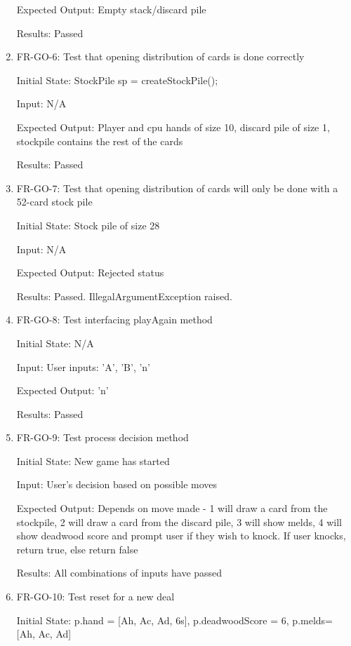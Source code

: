 \documentclass[12pt, titlepage]{article}
\begin{document}
\begin{enumerate}
    Expected Output: Empty stack/discard pile
    
    Results: Passed
    
    \item FR-GO-6: Test that opening distribution of cards is done correctly
    
    Initial State: StockPile sp = createStockPile();
    
    Input: N/A

    Expected Output: Player and cpu hands of size 10, discard pile of size 1, stockpile contains the rest of the cards

    Results: Passed
    
    \item FR-GO-7: Test that opening distribution of cards will only be  done with a 52-card stock pile 
    
    Initial State: Stock pile of size 28
    
    Input: N/A
    
    Expected Output: Rejected status
    
    Results: Passed. IllegalArgumentException raised.
    
    \item FR-GO-8: Test interfacing playAgain method
    
    Initial State: N/A
    
    Input: User inputs: ’A’, ’B’, ’n’
    
    Expected Output: 'n'
    
    Results: Passed
    
    \item FR-GO-9: Test process decision method
    
    Initial State: New game has started
    
    Input: User’s decision based on possible moves
    
    Expected Output: Depends on move made - 1 will draw a card from the stockpile, 2 will draw a card from the discard pile, 3 will show melds, 4 will show deadwood score and prompt user if they wish to knock. If user knocks, return true, else return false
    
    Results: All combinations of inputs have passed
    
    \item FR-GO-10: Test reset for a new deal
    
    Initial State: p.hand = [Ah, Ac, Ad, 6s], p.deadwoodScore = 6, p.melds= [Ah, Ac, Ad]
    

\end{enumerate}
\end{document}
